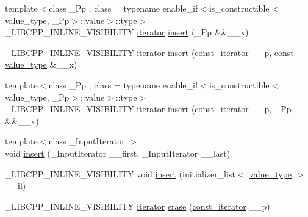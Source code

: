 \begin{DoxyCompactItemize}
\item 
{\footnotesize template$<$class \+\_\+\+Pp , class  = typename enable\+\_\+if$<$is\+\_\+constructible$<$value\+\_\+type, \+\_\+\+Pp$>$\+::value$>$\+::type$>$ }\\\+\_\+\+L\+I\+B\+C\+P\+P\+\_\+\+I\+N\+L\+I\+N\+E\+\_\+\+V\+I\+S\+I\+B\+I\+L\+I\+T\+Y \hyperlink{classunordered__multimap_a7b508cae41ac3a258ca80609ec43db47}{iterator} \hyperlink{classunordered__multimap_a96f2efb59cd120ae5857e5c2f7a437d4}{insert} (\+\_\+\+Pp \&\&\+\_\+\+\_\+x)
\item 
\+\_\+\+L\+I\+B\+C\+P\+P\+\_\+\+I\+N\+L\+I\+N\+E\+\_\+\+V\+I\+S\+I\+B\+I\+L\+I\+T\+Y \hyperlink{classunordered__multimap_a7b508cae41ac3a258ca80609ec43db47}{iterator} \hyperlink{classunordered__multimap_a6af8a3445b561be28451330ad736ee3f}{insert} (\hyperlink{classunordered__multimap_a3cb373bd19680f9933781c04905fde39}{const\+\_\+iterator} \+\_\+\+\_\+p, const \hyperlink{classunordered__multimap_a106d390dc0deafc47f10d3943b247ee6}{value\+\_\+type} \&\+\_\+\+\_\+x)
\item 
{\footnotesize template$<$class \+\_\+\+Pp , class  = typename enable\+\_\+if$<$is\+\_\+constructible$<$value\+\_\+type, \+\_\+\+Pp$>$\+::value$>$\+::type$>$ }\\\+\_\+\+L\+I\+B\+C\+P\+P\+\_\+\+I\+N\+L\+I\+N\+E\+\_\+\+V\+I\+S\+I\+B\+I\+L\+I\+T\+Y \hyperlink{classunordered__multimap_a7b508cae41ac3a258ca80609ec43db47}{iterator} \hyperlink{classunordered__multimap_a1294da4704436a4aae307f1432dbc531}{insert} (\hyperlink{classunordered__multimap_a3cb373bd19680f9933781c04905fde39}{const\+\_\+iterator} \+\_\+\+\_\+p, \+\_\+\+Pp \&\&\+\_\+\+\_\+x)
\item 
{\footnotesize template$<$class \+\_\+\+Input\+Iterator $>$ }\\void \hyperlink{classunordered__multimap_aa46c76f08824a8af85d7272bc2a81bb4}{insert} (\+\_\+\+Input\+Iterator \+\_\+\+\_\+first, \+\_\+\+Input\+Iterator \+\_\+\+\_\+last)
\item 
\+\_\+\+L\+I\+B\+C\+P\+P\+\_\+\+I\+N\+L\+I\+N\+E\+\_\+\+V\+I\+S\+I\+B\+I\+L\+I\+T\+Y void \hyperlink{classunordered__multimap_a2f13dfcf7e89ab38799698bf3025640a}{insert} (initializer\+\_\+list$<$ \hyperlink{classunordered__multimap_a106d390dc0deafc47f10d3943b247ee6}{value\+\_\+type} $>$ \+\_\+\+\_\+il)
\item 
\+\_\+\+L\+I\+B\+C\+P\+P\+\_\+\+I\+N\+L\+I\+N\+E\+\_\+\+V\+I\+S\+I\+B\+I\+L\+I\+T\+Y \hyperlink{classunordered__multimap_a7b508cae41ac3a258ca80609ec43db47}{iterator} \hyperlink{classunordered__multimap_a6c4897724475e1431d3b553859017ece}{erase} (\hyperlink{classunordered__multimap_a3cb373bd19680f9933781c04905fde39}{const\+\_\+iterator} \+\_\+\+\_\+p)

\end{DoxyCompactItemize}
